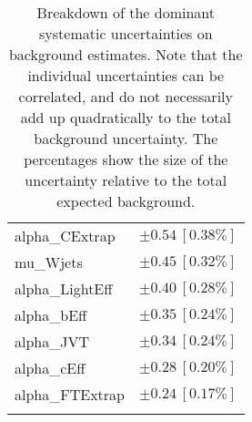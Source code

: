 \begin{table}
\begin{center}
\begin{tabular*}{\textwidth}{@{\extracolsep{\fill}}lc}
alpha\_CExtrap         & $\pm 0.54\ [0.38\%] $       \\
mu\_Wjets         & $\pm 0.45\ [0.32\%] $       \\
alpha\_LightEff         & $\pm 0.40\ [0.28\%] $       \\
alpha\_bEff         & $\pm 0.35\ [0.24\%] $       \\
alpha\_JVT         & $\pm 0.34\ [0.24\%] $       \\
alpha\_cEff         & $\pm 0.28\ [0.20\%] $       \\
alpha\_FTExtrap         & $\pm 0.24\ [0.17\%] $       \\
\noalign{\smallskip}\hline\noalign{\smallskip}
\end{tabular*}
\end{center}
\caption[Breakdown of uncertainty on background estimates]{
Breakdown of the dominant systematic uncertainties on background estimates.
Note that the individual uncertainties can be correlated, and do not necessarily add up quadratically to 
the total background uncertainty. The percentages show the size of the uncertainty relative to the total expected background.
\label{table.results.bkgestimate.uncertainties.VRTopBTT}}
\end{table}
%